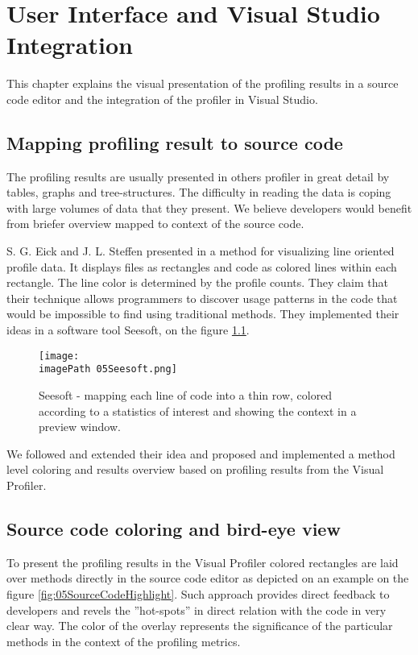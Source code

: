 \chapter{User Interface and Visual Studio Integration }
\label{chap:VPUIandSI}


This chapter explains the visual presentation of the profiling results in a source code editor and the integration of the profiler in Visual Studio.

\section{Mapping profiling result to source code}
The profiling results are usually presented in others profiler in great detail by tables, graphs and tree-structures. The difficulty in reading the data is coping with large volumes of data that they present. We believe developers would benefit from briefer overview mapped to context of the source code.

S. G. Eick and J. L. Steffen presented in \cite{EickSteffen92} a method for visualizing line oriented profile data. It displays files as rectangles and code as colored lines within each rectangle. The line color is determined by the profile counts. They claim that their technique allows programmers to discover usage patterns in the code that would be impossible to find using traditional methods. They implemented their ideas in a software tool Seesoft, on the figure \ref{fig:05SeeSoft}.

\begin{figure}
	\centering
		\texttt{[image: \\imagePath 05Seesoft.png]}
		\caption{Seesoft - mapping each line of code into a thin row, colored according to a statistics of interest and showing the context in a preview window.}
	\label{fig:05SeeSoft}
\end{figure}


We followed and extended their idea and proposed and implemented a method level coloring and results overview based on profiling results from the Visual Profiler. 

\section{Source code coloring and bird-eye view}
To present the profiling results in the Visual Profiler colored rectangles are laid over methods directly in the source code editor as depicted on an example on the figure \ref{fig:05SourceCodeHighlight}. Such approach provides direct feedback to developers and revels the ''hot-spots'' in direct relation with the code in very clear way.  The color of the overlay represents the significance of the particular methods in the context of the profiling metrics.

